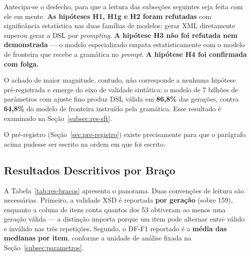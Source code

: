 Antecipa-se o desfecho, para que a leitura das subseções seguintes seja feita com ele em mente. \textbf{As hipóteses H1, H1g e H2 foram refutadas} com significância estatística nas duas famílias de modelos: gerar XML diretamente superou gerar a DSL por \textit{prompting}. \textbf{A hipótese H3 não foi refutada nem demonstrada} --- o modelo especializado empata estatisticamente com o modelo de fronteira que recebe a gramática no \textit{prompt}. \textbf{A hipótese H4 foi confirmada com folga.}

O achado de maior magnitude, contudo, não corresponde a nenhuma hipótese pré-registrada e emerge do eixo de validade sintática: o modelo de 7 bilhões de parâmetros com ajuste fino produz DSL válida em \textbf{86,8\%} das gerações, contra \textbf{64,8\%} do modelo de fronteira instruído pela gramática. Esse resultado é examinado na Seção~\ref{subsec:res-sft}.

O pré-registro (Seção~\ref{sec:pre-registro}) existe precisamente para que o parágrafo acima pudesse ser escrito na ordem em que foi escrito.

\subsection{Resultados Descritivos por Braço}
\label{subsec:res-descritivo}

A Tabela~\ref{tab:res-bracos} apresenta o panorama. Duas convenções de leitura são necessárias. Primeiro, a validade XSD é reportada \textbf{por geração} (sobre 159), enquanto a coluna de itens conta quantos dos 53 obtiveram ao menos uma geração válida — a distinção importa porque um item pode alternar entre válido e inválido nas três repetições. Segundo, o DF-F1 reportado é a \textbf{média das medianas por item}, conforme a unidade de análise fixada na Seção~\ref{subsec:parametros}.

